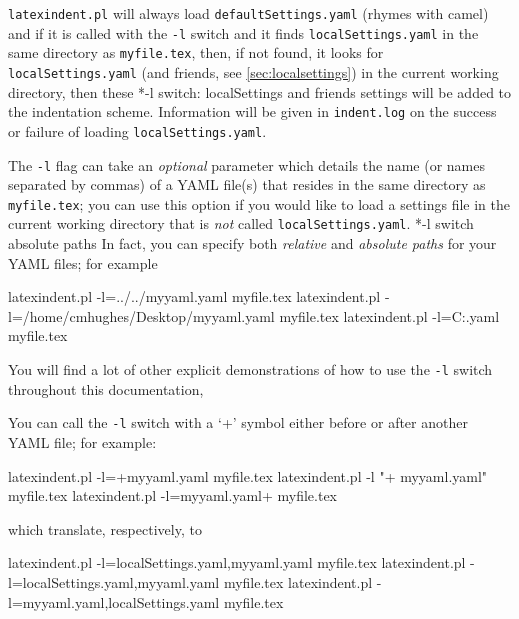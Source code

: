 \documentclass[10pt]{article}
\begin{document}
 \label{page:localswitch}
 \texttt{latexindent.pl} will always load \texttt{defaultSettings.yaml} (rhymes with
 camel) and if it is called with the \texttt{-l} switch and it finds
 \texttt{localSettings.yaml} in the same directory as \texttt{myfile.tex}, then, if not
 found, it looks for \texttt{localSettings.yaml} (and friends, see
 \vref{sec:localsettings}) in the current working directory, then
 these%
 *{-l switch: localSettings and
 friends} settings will be added to the indentation scheme. Information will be given in
 \texttt{indent.log} on the success or failure of loading \texttt{localSettings.yaml}.

 The \texttt{-l} flag can take an \emph{optional} parameter which details the name (or
 names separated by commas) of a YAML file(s) that resides in the same directory as
 \texttt{myfile.tex}; you can use this option if you would like to load a settings file
 in the current working directory that is \emph{not} called \texttt{localSettings.yaml}.
 *{-l switch absolute paths} In fact, you can specify both
 \emph{relative} and \emph{absolute paths} for your YAML files; for example%

 \begin{commandshell}
latexindent.pl -l=../../myyaml.yaml myfile.tex
latexindent.pl -l=/home/cmhughes/Desktop/myyaml.yaml myfile.tex
latexindent.pl -l=C:\Users\cmhughes\Desktop\myyaml.yaml myfile.tex
\end{commandshell}

 You will find a lot of other explicit demonstrations of how to use the \texttt{-l}
 switch throughout this documentation,

 You can call the \texttt{-l} switch with a `+' symbol either before or after
  another YAML file; for example:

 \begin{commandshell}
latexindent.pl -l=+myyaml.yaml myfile.tex
latexindent.pl -l "+ myyaml.yaml" myfile.tex
latexindent.pl -l=myyaml.yaml+  myfile.tex
\end{commandshell}

 which translate, respectively, to

 \begin{commandshell}
latexindent.pl -l=localSettings.yaml,myyaml.yaml myfile.tex
latexindent.pl -l=localSettings.yaml,myyaml.yaml myfile.tex
latexindent.pl -l=myyaml.yaml,localSettings.yaml myfile.tex
\end{commandshell}
\end{document}
